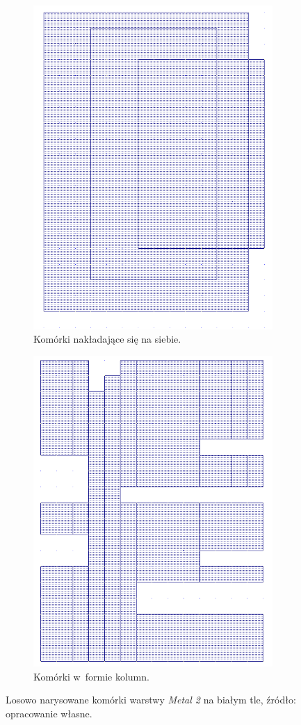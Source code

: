 \begin{figure}[h]
    \centering
    \begin{subfigure}{.45\textwidth}
        \centering
        \includegraphics[width=.5\linewidth]{chapters/chapter2/img/microwind_nadpisanie}
        \caption{Komórki nakładające się na siebie.}
        \label{fig:microwind_nadpisanie}
    \end{subfigure}
    \begin{subfigure}{.45\textwidth}
        \centering
        \includegraphics[width=.5\linewidth]{chapters/chapter2/img/microwind_kolumny}
        \caption{Komórki w~formie kolumn.}
        \label{fig:microwind_kolumny}
    \end{subfigure}
    \caption[Losowo narysowane komórki warstwy \textit{Metal 2} na białym tle.]
    {
        Losowo narysowane komórki warstwy \textit{Metal 2} na białym tle,
        źródło: opracowanie własne.
    }
    \label{fig:microwind_biale}
\end{figure}

